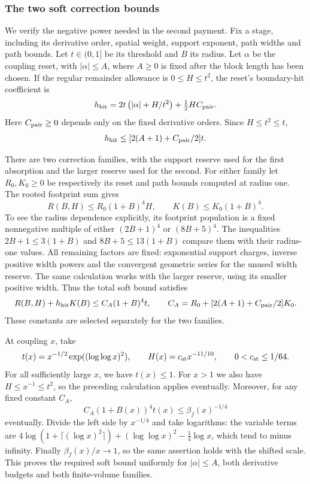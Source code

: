 \subsubsection{The two soft correction bounds}
We verify the negative power needed in the second payment.
Fix a stage, including its derivative order, spatial weight,
support exponent, path widths and path bounds. Let $t\in(0,1]$
be its threshold and $B$ its radius. Let $\alpha$ be the coupling
reset, with $|\alpha|\le A$, where $A\ge0$ is fixed after the
block length has been chosen. If the regular remainder allowance
is $0\le H\le t^2$, the reset's boundary-hit coefficient is
\[
       h_{\rm hit}=2t\left(|\alpha|+H/t^2\right)
                                      +\tfrac12 H C_{\rm pair}.
\]
Here $C_{\rm pair}\ge0$ depends only on the fixed derivative
orders. Since $H\le t^2\le t$,
\[
       h_{\rm hit}\le[2(A+1)+C_{\rm pair}/2]t.
\]

There are two correction families, with the support reserve used
for the first absorption and the larger reserve used for the second.
For either family let $R_0,K_0\ge0$ be respectively its reset and
path bounds computed at radius one. The rooted footprint sum gives
\[
 R(B,H)\le R_0(1+B)^4H,\qquad
                         K(B)\le K_0(1+B)^4.
\]
To see the radius dependence explicitly, its footprint population
is a fixed nonnegative multiple of either $(2B+1)^4$ or
$(8B+5)^4$. The inequalities
$2B+1\le3(1+B)$ and $8B+5\le13(1+B)$ compare them with their
radius-one values. All remaining factors are fixed: exponential
support charges, inverse positive width powers and the convergent
geometric series for the unused width reserve. The same calculation
works with the larger reserve, using its smaller positive width.
Thus the total soft bound satisfies
\begin{equation}\label{eq:nonlinear-soft-price}
 R(B,H)+h_{\rm hit}K(B)
 \le C_A(1+B)^4t,\qquad
 C_A=R_0+[2(A+1)+C_{\rm pair}/2]K_0.
\end{equation}
These constants are selected separately for the two families.

At coupling $x$, take
\[
 t(x)=x^{-1/2}\exp((\log\log x)^2),\qquad
 H(x)=c_{\rm st}x^{-11/10},\qquad 0<c_{\rm st}\le1/64.
\]
For all sufficiently large $x$, we have $t(x)\le1$.
For $x>1$ we also have $H\le x^{-1}\le t^2$, so the preceding
calculation applies eventually. Moreover, for any fixed constant $C_A$,
\[
 C_A(1+B(x))^4t(x)\le\beta_f(x)^{-1/4}
\]
eventually. Divide the left side by $x^{-1/4}$ and take logarithms:
the variable terms are
$4\log(1+\lceil(\log x)^2\rceil)+(\log\log x)^2-
\tfrac14\log x$, which tend to minus infinity. Finally
$\beta_f(x)/x\to1$, so the same assertion holds with the shifted
scale. This proves the required soft bound uniformly for
$|\alpha|\le A$, both derivative budgets and both finite-volume
families.

